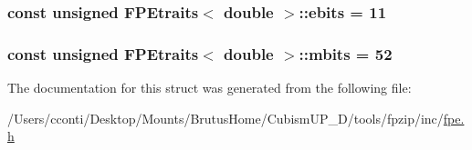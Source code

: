 \subsubsection[{ebits}]{\setlength{\rightskip}{0pt plus 5cm}const unsigned {\bf F\+P\+Etraits}$<$ double $>$\+::ebits = 11\hspace{0.3cm}{\ttfamily [static]}}\label{struct_f_p_etraits_3_01double_01_4_a468104543d41c130edc80a0d38b58866}
\hypertarget{struct_f_p_etraits_3_01double_01_4_a2f453e5079ff96e2eda4afe95e24acaa}{}
\subsubsection[{mbits}]{\setlength{\rightskip}{0pt plus 5cm}const unsigned {\bf F\+P\+Etraits}$<$ double $>$\+::mbits = 52\hspace{0.3cm}{\ttfamily [static]}}\label{struct_f_p_etraits_3_01double_01_4_a2f453e5079ff96e2eda4afe95e24acaa}


The documentation for this struct was generated from the following file\+:\begin{DoxyCompactItemize}
\item 
/\+Users/cconti/\+Desktop/\+Mounts/\+Brutus\+Home/\+Cubism\+U\+P\+\_\+D/tools/fpzip/inc/\hyperlink{fpe_8h}{fpe.\+h}\end{DoxyCompactItemize}
